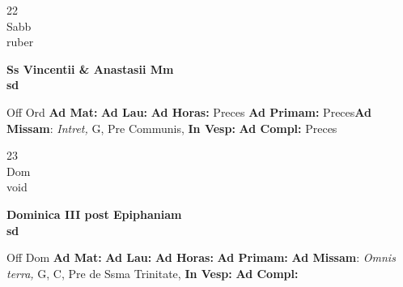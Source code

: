 \documentclass[10pt, openany]{book}
\begin{document}
    \begin{center}
        \begin{minipage}{3.5in}
            \vspace{2em}
            \begin{minipage}{0.5in}
                {\Huge 22} \\
                {\normalsize Sabb} \\
                {\normalsize ruber}
            \end{minipage}
            \begin{minipage}{3.0in}
                \textbf{ \large Ss Vincentii \& Anastasii Mm \\
                \textnormal{\normalsize sd}} \\ 
            \end{minipage}
            \begin{justify}Off Ord
                \textbf{Ad Mat: }
                \textbf{Ad Lau: }
                \textbf{Ad Horas: }Preces
                \textbf{Ad Primam: }Preces\textbf{Ad Missam}: \textit{Intret,} G, Pre Communis,  
                \textbf{In Vesp: }
                \textbf{Ad Compl: }Preces
            \end{justify}
        \end{minipage}
    \end{center}

    \begin{center}
        \begin{minipage}{3.5in}
            \vspace{2em}
            \begin{minipage}{0.5in}
                {\Huge 23} \\
                {\normalsize Dom} \\
                {\normalsize void}
            \end{minipage}
            \begin{minipage}{3.0in}
                \textbf{ \large Dominica III post Epiphaniam \\
                \textnormal{\normalsize sd}} \\ 
            \end{minipage}
            \begin{justify}Off Dom
                \textbf{Ad Mat: }
                \textbf{Ad Lau: }
                \textbf{Ad Horas: }
                \textbf{Ad Primam: }\textbf{Ad Missam}: \textit{Omnis terra,} G, C, Pre de Ssma Trinitate,  
                \textbf{In Vesp: }
                \textbf{Ad Compl: }
            \end{justify}
        \end{minipage}
    \end{center}
\end{document}
